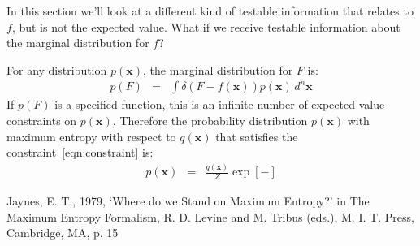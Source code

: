 \documentclass[letterpaper, 11pt]{article}
\newcommand{\xx}{\boldsymbol{x}}
\begin{document}
In this section we'll look at a different kind of testable information that
relates to $f$, but is not the expected value. What if we receive testable
information about the marginal distribution for $f$?

For any distribution $p(\boldsymbol{x})$, the marginal distribution for $F$ is:
\begin{eqnarray}
p(F) &=& \int \delta\left(F - f(\boldsymbol{x})\right)p(\boldsymbol{x}) \, d^n \boldsymbol{x}\label{eqn:constraint}
\end{eqnarray}
If $p(F)$ is a specified function, this is an infinite number of expected
value constraints on $p(\xx)$. Therefore the probability distribution
$p(\xx)$ with maximum entropy with respect to $q(\xx)$ that satisfies the
constraint~\ref{eqn:constraint} is:
\begin{eqnarray}
p(\xx) &=& \frac{q(\xx)}{Z}\exp\left[- \right]
\end{eqnarray}





\begin{thebibliography}{}
Jaynes, E. T., 1979, `Where do we Stand on Maximum Entropy?' in The Maximum Entropy Formalism, R. D. Levine and M. Tribus (eds.), M. I. T. Press, Cambridge, MA, p. 15
\end{thebibliography}
\end{document}
